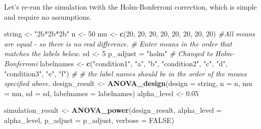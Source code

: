 \documentclass[]{book}
\newenvironment{Shaded}{\begin{snugshade}}{\end{snugshade}}
\newcommand{\CommentTok}[1]{\textcolor[rgb]{0.56,0.35,0.01}{\textit{#1}}}
\newcommand{\DataTypeTok}[1]{\textcolor[rgb]{0.13,0.29,0.53}{#1}}
\newcommand{\DecValTok}[1]{\textcolor[rgb]{0.00,0.00,0.81}{#1}}
\newcommand{\FloatTok}[1]{\textcolor[rgb]{0.00,0.00,0.81}{#1}}
\newcommand{\KeywordTok}[1]{\textcolor[rgb]{0.13,0.29,0.53}{\textbf{#1}}}
\newcommand{\NormalTok}[1]{#1}
\newcommand{\OtherTok}[1]{\textcolor[rgb]{0.56,0.35,0.01}{#1}}
\newcommand{\StringTok}[1]{\textcolor[rgb]{0.31,0.60,0.02}{#1}}
\begin{document}
Let's re-run the simulation twith the Holm-Bonferroni correction, which is simple and require no assumptions.

\begin{Shaded}
\begin{Highlighting}[]
\NormalTok{string <-}\StringTok{ "2b*2b*2b"}
\NormalTok{n <-}\StringTok{ }\DecValTok{50}
\NormalTok{mu <-}\StringTok{ }\KeywordTok{c}\NormalTok{(}\DecValTok{20}\NormalTok{, }\DecValTok{20}\NormalTok{, }\DecValTok{20}\NormalTok{, }\DecValTok{20}\NormalTok{, }\DecValTok{20}\NormalTok{, }\DecValTok{20}\NormalTok{, }\DecValTok{20}\NormalTok{, }\DecValTok{20}\NormalTok{) }
\CommentTok{#All means are equal - so there is no real difference.}
\CommentTok{# Enter means in the order that matches the labels below.}
\NormalTok{sd <-}\StringTok{ }\DecValTok{5}
\NormalTok{p_adjust =}\StringTok{ "holm"}
\CommentTok{# Changed to Holm-Bonferroni}
\NormalTok{labelnames <-}\StringTok{ }\KeywordTok{c}\NormalTok{(}\StringTok{"condition1"}\NormalTok{, }\StringTok{"a"}\NormalTok{, }\StringTok{"b"}\NormalTok{, }
                \StringTok{"condition2"}\NormalTok{, }\StringTok{"c"}\NormalTok{, }\StringTok{"d"}\NormalTok{, }
                \StringTok{"condition3"}\NormalTok{, }\StringTok{"e"}\NormalTok{, }\StringTok{"f"}\NormalTok{) }\CommentTok{#}
\CommentTok{# the label names should be in the order of the means specified above.}
\NormalTok{design_result <-}\StringTok{ }\KeywordTok{ANOVA_design}\NormalTok{(}\DataTypeTok{design =}\NormalTok{ string,}
                   \DataTypeTok{n =}\NormalTok{ n, }
                   \DataTypeTok{mu =}\NormalTok{ mu, }
                   \DataTypeTok{sd =}\NormalTok{ sd, }
                   \DataTypeTok{labelnames =}\NormalTok{ labelnames)}
\NormalTok{alpha_level <-}\StringTok{ }\FloatTok{0.05}


\NormalTok{simulation_result <-}\StringTok{ }\KeywordTok{ANOVA_power}\NormalTok{(design_result, }
                                 \DataTypeTok{alpha_level =}\NormalTok{ alpha_level,}
                                 \DataTypeTok{p_adjust =}\NormalTok{ p_adjust,}
                                 \DataTypeTok{verbose =} \OtherTok{FALSE}\NormalTok{)}
\end{Highlighting}
\end{Shaded}
\end{document}
